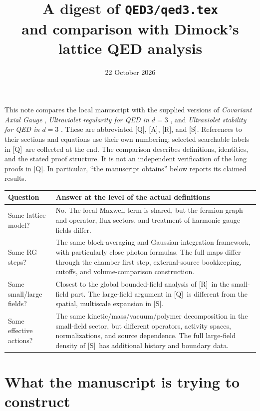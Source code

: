 \documentclass[11pt]{article}
\title{A digest of \texttt{QED3/qed3.tex}\\
and comparison with Dimock's lattice QED analysis}
\author{}
\date{22 October 2026}
\numberwithin{equation}{section}
\newcommand{\Q}{\textup{[Q]}}
\newcommand{\AG}{\textup{[A]}}
\newcommand{\UR}{\textup{[R]}}
\newcommand{\US}{\textup{[S]}}
\begin{document}
\maketitle

This note compares the local manuscript \cite{Q} with the supplied
versions of \emph{Covariant Axial Gauge} \cite{A},
\emph{Ultraviolet regularity for QED in $d=3$} \cite{R}, and
\emph{Ultraviolet stability for QED in $d=3$} \cite{S}.
These are abbreviated \Q, \AG, \UR, and \US.
References to their sections and equations use their own numbering;
selected searchable labels in \Q\ are collected at the end.
The comparison describes definitions, identities, and the stated proof
structure. It is not an independent verification of the long proofs in \Q.
In particular, ``the manuscript obtains'' below reports its claimed results.

\begin{center}
\begin{tabular}{@{}P{0.24\textwidth}P{0.70\textwidth}@{}}
\toprule
Question & Answer at the level of the actual definitions\\
\midrule
Same lattice model? & No. The local Maxwell term is shared, but the
fermion graph and operator, flux sectors, and treatment of harmonic
gauge fields differ.\\[5pt]
Same RG steps? & The same block-averaging and Gaussian-integration
framework, with particularly close photon formulas. The full maps
differ through the chamber first step, external-source bookkeeping,
cutoffs, and volume-comparison construction.\\[5pt]
Same small/large fields? & Closest to the global bounded-field analysis
of \UR\ in the small-field part. The large-field argument in \Q\ is
different from the spatial, multiscale expansion in \US.\\[5pt]
Same effective actions? & The same kinetic/mass/vacuum/polymer
decomposition in the small-field sector, but different operators,
activity spaces, normalizations, and source dependence. The full
large-field density of \US\ has additional history and boundary data.\\
\bottomrule
\end{tabular}
\end{center}

\section{What the manuscript is trying to construct}
\end{document}

